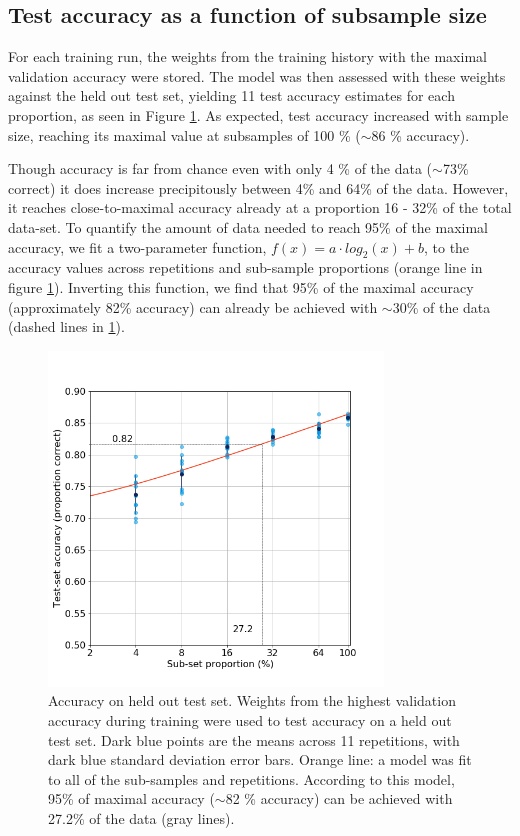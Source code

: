\subsection{Test accuracy as a function of subsample size}

For each training run, the weights from the training history with the maximal
validation accuracy were stored. The model was then assessed with these weights
against the held out test set, yielding 11 test accuracy estimates for each
proportion, as seen in Figure \ref{fig_test}. As expected, test accuracy
increased with sample size, reaching its maximal value at subsamples of 100 \%
($\sim$86 \% accuracy).

Though accuracy is far from chance even with only 4 \% of the data ($\sim$73\%
correct) it does increase precipitously between 4\% and 64\% of the data.
However, it reaches close-to-maximal accuracy already at a proportion 16 - 32\%
of the total data-set. To quantify the amount of data needed to reach 95\% of
the maximal accuracy, we fit a two-parameter function, $f(x) = a \cdot log_2(x) + b$,
to the accuracy values across repetitions and sub-sample proportions (orange 
line in figure \ref{fig_test}). Inverting this function, we find that 95\% of 
the maximal accuracy (approximately 82\% accuracy) can already be achieved with 
$\sim30\%$ of the data (dashed lines in \ref{fig_test}).

\begin{figure}[!t]
\centering
\includegraphics[width=3.5in]{./figures/test}

\caption{Accuracy on held out test set. Weights from the highest validation
accuracy during training were used to test accuracy on a held out test set. Dark
blue points are the means across 11 repetitions, with dark blue standard
deviation error bars. Orange line: a model was fit to all of the sub-samples and 
repetitions. According to this model, 95\% of maximal accuracy
($\sim$82 \% accuracy) can be achieved with 27.2\% of the data (gray lines).}

\label{fig_test}
\end{figure}

